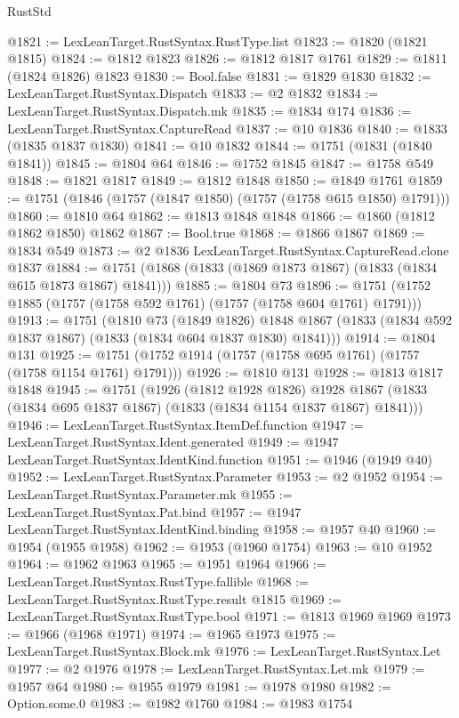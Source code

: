 \begin{lexlean}{RustStd}
\begin{coremodule}
{\begin{coremodule}
{{{{{{{{{{{{{{{{{{{{{{{{{{{{{{{@1821 := LexLeanTarget.RustSyntax.RustType.list
@1823 := @1820 (@1821 @1815)
@1824 := @1812 @1823
@1826 := @1812 @1817 @1761
@1829 := @1811 (@1824 @1826) @1823
@1830 := Bool.false
@1831 := @1829 @1830
@1832 := LexLeanTarget.RustSyntax.Dispatch
@1833 := @2 @1832
@1834 := LexLeanTarget.RustSyntax.Dispatch.mk
@1835 := @1834 @174
@1836 := LexLeanTarget.RustSyntax.CaptureRead
@1837 := @10 @1836
@1840 := @1833 (@1835 @1837 @1830)
@1841 := @10 @1832
@1844 := @1751 (@1831 (@1840 @1841))
@1845 := @1804 @64
@1846 := @1752 @1845
@1847 := @1758 @549
@1848 := @1821 @1817
@1849 := @1812 @1848
@1850 := @1849 @1761
@1859 := @1751 (@1846 (@1757 (@1847 @1850) (@1757 (@1758 @615 @1850) @1791)))
@1860 := @1810 @64
@1862 := @1813 @1848 @1848
@1866 := @1860 (@1812 @1862 @1850) @1862
@1867 := Bool.true
@1868 := @1866 @1867
@1869 := @1834 @549
@1873 := @2 @1836 LexLeanTarget.RustSyntax.CaptureRead.clone @1837
@1884 := @1751 (@1868 (@1833 (@1869 @1873 @1867) (@1833 (@1834 @615 @1873 @1867) @1841)))
@1885 := @1804 @73
@1896 := @1751 (@1752 @1885 (@1757 (@1758 @592 @1761) (@1757 (@1758 @604 @1761) @1791)))
@1913 := @1751
    (@1810
      @73
      (@1849 @1826)
      @1848
      @1867
      (@1833 (@1834 @592 @1837 @1867) (@1833 (@1834 @604 @1837 @1830) @1841)))
@1914 := @1804 @131
@1925 := @1751 (@1752 @1914 (@1757 (@1758 @695 @1761) (@1757 (@1758 @1154 @1761) @1791)))
@1926 := @1810 @131
@1928 := @1813 @1817 @1848
@1945 := @1751
    (@1926
      (@1812 @1928 @1826)
      @1928
      @1867
      (@1833 (@1834 @695 @1837 @1867) (@1833 (@1834 @1154 @1837 @1867) @1841)))
@1946 := LexLeanTarget.RustSyntax.ItemDef.function
@1947 := LexLeanTarget.RustSyntax.Ident.generated
@1949 := @1947 LexLeanTarget.RustSyntax.IdentKind.function
@1951 := @1946 (@1949 @40)
@1952 := LexLeanTarget.RustSyntax.Parameter
@1953 := @2 @1952
@1954 := LexLeanTarget.RustSyntax.Parameter.mk
@1955 := LexLeanTarget.RustSyntax.Pat.bind
@1957 := @1947 LexLeanTarget.RustSyntax.IdentKind.binding
@1958 := @1957 @40
@1960 := @1954 (@1955 @1958)
@1962 := @1953 (@1960 @1754)
@1963 := @10 @1952
@1964 := @1962 @1963
@1965 := @1951 @1964
@1966 := LexLeanTarget.RustSyntax.RustType.fallible
@1968 := LexLeanTarget.RustSyntax.RustType.result @1815
@1969 := LexLeanTarget.RustSyntax.RustType.bool
@1971 := @1813 @1969 @1969
@1973 := @1966 (@1968 @1971)
@1974 := @1965 @1973
@1975 := LexLeanTarget.RustSyntax.Block.mk
@1976 := LexLeanTarget.RustSyntax.Let
@1977 := @2 @1976
@1978 := LexLeanTarget.RustSyntax.Let.mk
@1979 := @1957 @64
@1980 := @1955 @1979
@1981 := @1978 @1980
@1982 := Option.some.{0}
@1983 := @1982 @1760
@1984 := @1983 @1754
}}}}}}}}}}}}}}}}}}}}}}}}}}}}}}}
\end{coremodule}}
\end{coremodule}
\end{lexlean}
